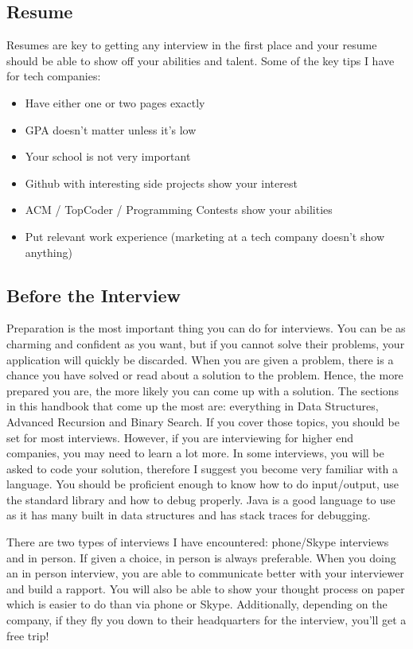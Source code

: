 \documentclass[11pt,oneside]{book}
\begin{document}
\subsection{Resume}

Resumes are key to getting any interview in the first place and your resume should be able to show off your abilities and talent. Some of the key tips I have for tech companies:

\begin{itemize}
\item Have either one or two pages exactly
\item GPA doesn't matter unless it's low
\item Your school is not very important
\item Github with interesting side projects show your interest
\item ACM / TopCoder / Programming Contests show your abilities
\item Put relevant work experience (marketing at a tech company doesn't show anything)
\end{itemize}

\subsection{Before the Interview}

Preparation is the most important thing you can do for interviews. You can be as charming and confident as you want, but if you cannot solve their problems, your application will quickly be discarded. When you are given a problem, there is a chance you have solved or read about a solution to the problem. Hence, the more prepared you are, the more likely you can come up with a solution. The sections in this handbook that come up the most are: everything in Data Structures, Advanced Recursion and Binary Search. If you cover those topics, you should be set for most interviews. However, if you are interviewing for higher end companies, you may need to learn a lot more. In some interviews, you will be asked to code your solution, therefore I suggest you become very familiar with a language. You should be proficient enough to know how to do input/output, use the standard library and how to debug properly. Java is a good language to use as it has many built in data structures and has stack traces for debugging.

There are two types of interviews I have encountered: phone/Skype interviews and in person. If given a choice, in person is always preferable. When you doing an in person interview, you are able to communicate better with your interviewer and build a rapport. You will also be able to show your thought process on paper which is easier to do than via phone or Skype. Additionally, depending on the company, if they fly you down to their headquarters for the interview, you'll get a free trip!
\end{document}
